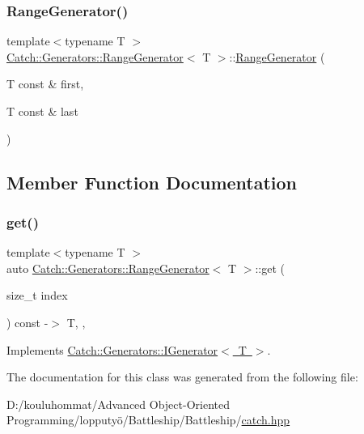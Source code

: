 \subsubsection{\texorpdfstring{Range\+Generator()}{RangeGenerator()}}
{\footnotesize\ttfamily template$<$typename T $>$ \\
\mbox{\hyperlink{class_catch_1_1_generators_1_1_range_generator}{Catch\+::\+Generators\+::\+Range\+Generator}}$<$ T $>$\+::\mbox{\hyperlink{class_catch_1_1_generators_1_1_range_generator}{Range\+Generator}} (\begin{DoxyParamCaption}\item[{T const \&}]{first,  }\item[{T const \&}]{last }\end{DoxyParamCaption})\hspace{0.3cm}{\ttfamily [inline]}}



\subsection{Member Function Documentation}
\mbox{\label{class_catch_1_1_generators_1_1_range_generator_a78f7f624b7545823d1a683ebf2ac00e7}} 
\subsubsection{\texorpdfstring{get()}{get()}}
{\footnotesize\ttfamily template$<$typename T $>$ \\
auto \mbox{\hyperlink{class_catch_1_1_generators_1_1_range_generator}{Catch\+::\+Generators\+::\+Range\+Generator}}$<$ T $>$\+::get (\begin{DoxyParamCaption}\item[{size\+\_\+t}]{index }\end{DoxyParamCaption}) const -\/$>$ T\hspace{0.3cm}{\ttfamily [inline]}, {\ttfamily [override]}, {\ttfamily [virtual]}}



Implements \mbox{\hyperlink{struct_catch_1_1_generators_1_1_i_generator_a737a89eb0bff02e580e36c59fb0d1171}{Catch\+::\+Generators\+::\+I\+Generator$<$ T $>$}}.



The documentation for this class was generated from the following file\+:\begin{DoxyCompactItemize}
\item 
D\+:/kouluhommat/\+Advanced Object-\/\+Oriented Programming/lopputyö/\+Battleship/\+Battleship/\mbox{\hyperlink{catch_8hpp}{catch.\+hpp}}\end{DoxyCompactItemize}
